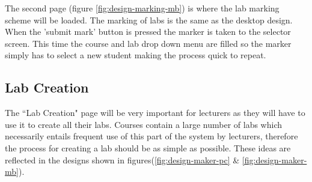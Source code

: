 \documentclass[11pt]{report}
\begin{document}
\noindent The second page (figure \ref{fig:design-marking-mb}) is where the lab marking scheme will be loaded. The marking of labs is the same as the desktop design. When the 'submit mark' button is pressed the marker is taken to the selector screen. This time the course and lab drop down menu are filled so the marker simply has to select a new student making the process quick to repeat. 



\newpage
\subsection{Lab Creation}
The ``Lab Creation" page will be very important for lecturers as they will have to use it to create all their labs. Courses contain a large number of labs which necessarily entails frequent  use of this part of the system by lecturers, therefore the process for creating a lab should be as simple as possible. These ideas are reflected in the designs shown in figures(\ref{fig:design-maker-pc} \& \ref{fig:design-maker-mb}).
\end{document}
